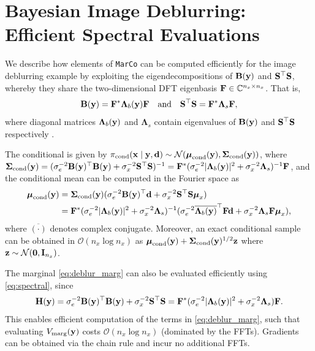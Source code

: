 \documentclass[onefignum,onetabnum]{siamonline250211}
\renewcommand{\t} {^{\top}}                                %
\newcommand{\bigO}  [1]  {\calO\!\left(#1\right)}
\newcommand{\bfLambda}{{\boldsymbol{\Lambda}}}
\newcommand{\bfSigma}{{\boldsymbol{\Sigma}}}
\newcommand{\bfmu}{{\boldsymbol{\mu}}}
\newcommand{\bfB}{{\bf B}}
\newcommand{\bfF}{{\bf F}}
\newcommand{\bfH}{{\bf H}}
\newcommand{\bfI}{{\bf I}}
\newcommand{\bfS}{{\bf S}}
\newcommand{\bfd}{{\bf d}}
\newcommand{\bfx}{{\bf x}}
\newcommand{\bfy}{{\bf y}}
\newcommand{\bfz}{{\bf z}}
\newcommand{\bfzero}{{\bf0}}
\newcommand{\calN}{\mathcal{N}}
\newcommand{\calO}{\mathcal{O}}
\newcommand{\bbC}{\mathbb{C}}
\newcommand{\nx}{{n_{x}}}
\newcommand{\pcond}{\pi_{\rm cond}}
\newcommand{\MarCo}{\textnormal{\texttt{MarCo}}\xspace}
\begin{document}
%
%

%
%

%
%
%
%
%
%
%
%
%
%
%
%
%
%
%
%
%
%
%
%
%
%
%
%
%
%
%
%
%
%
%
%
%
%
%
%
%
%
%
%
%

%
%

%
%
%
%
%
%
%
%
%

%
%
%
%
%
%
%
%
%
%
%
%
%
%

%
%
%
%
%
%
%
%
%
%
%
%
%

\section{Bayesian Image Deblurring: Efficient Spectral Evaluations}
\label{app:deblur-spectral}
%
We describe how elements of \MarCo can be computed efficiently for the image deblurring example by exploiting the eigendecompositions of $\bfB(\bfy)$ and $\bfS\t \bfS$, whereby they share the two-dimensional DFT eigenbasis $\bfF\in\bbC^{\nx\times\nx}$.  That is,
\begin{equation}
\label{eq:spectral}
   \bfB(\bfy) = \bfF^* \bfLambda_b(\bfy) \bfF \quad \mbox{and} \quad \bfS\t \bfS = \bfF^* \bfLambda_s \bfF,
\end{equation}
where diagonal matrices  $\bfLambda_b(\bfy)$ and $\bfLambda_s$ contain eigenvalues of $\bfB(\bfy)$ and $\bfS\t \bfS$ respectively \cite{hansen_deblurring_2006}.


The conditional is given by $\pcond(\bfx \mid \bfy, \bfd) \sim\calN(\bfmu_{\rm cond}(\bfy),\bfSigma_{\rm cond}(\bfy))$, where 
$\bfSigma_{\rm cond}(\bfy) = (\sigma_{e}^{-2}\bfB(\bfy)\t \bfB(\bfy) + \sigma_x^{-2}\bfS\t \bfS )^{-1} = \bfF^* (\sigma_{e}^{-2} |\bfLambda_b(\bfy)|^2 +\sigma_x^{-2} \bfLambda_s)^{-1} \bfF$, and 
the conditional mean can be computed in the Fourier space as
\begin{align}
    \bfmu_{\rm cond}(\bfy)&=\bfSigma_{\rm cond}(\bfy)(\sigma_{e}^{-2}\bfB(\bfy)\t \bfd + \sigma_x^{-2} \bfS\t \bfS \bfmu_x) \\
    &= \bfF^* (\sigma_{e}^{-2} |\bfLambda_b(\bfy)|^2 +\sigma_x^{-2} \bfLambda_s)^{-1}(\sigma_{e}^{-2}\overline{\bfLambda_b(\bfy)}\t \bfF \bfd + \sigma_x^{-2} \bfLambda_s \bfF \bfmu_x),
\end{align}
where $\overline{(\cdot)}$ denotes complex conjugate.
Moreover, an exact conditional sample can be obtained in $\bigO{\nx\log\nx}$ as $\bfmu_{\rm cond}(\bfy) + \bfSigma_{\rm cond}(\bfy)^{1/2} \bfz$
where $\bfz\sim\calN(\bfzero,\bfI_\nx)$.


The marginal \eqref{eq:deblur_marg} can also be evaluated efficiently using \eqref{eq:spectral}, since
\begin{equation}
    \bfH(\bfy) = \sigma_e^{-2}\bfB(\bfy)\t\bfB(\bfy)
    +\sigma_x^{-2}\bfS\t\bfS
    = \bfF^* ( \sigma_e^{-2} |\bfLambda_b(\bfy)|^2 + \sigma_x^{-2} \bfLambda_s) \bfF .
\end{equation}
%
%
%
%
This enables efficient computation of the terms in \eqref{eq:deblur_marg}, such that evaluating $V_{\rm marg}(\bfy)$ costs
$\bigO{\nx\log\nx}$ (dominated by the FFTs). Gradients can be obtained via the chain rule and incur no additional FFTs.
%
%
%
%
%



%
%
%

%
%
%
%
%
%
%
%
%
%
%
%
%
%

%
%
%
%
%
%
%
%
%
%
%
%
%
%
%
%
%
%
%
%
%
%
%
%
%
%
%
%
%
%
%
%
%
%
%
%
%
%
%
%
%
%
%
%


 
%
%
%
%
%
%
%
%
%
%
%
\end{document}
